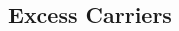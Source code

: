 \documentclass[a4paper, fontsize=8pt, landscape, DIV=1]{scrartcl}
\begin{document}
\begin{multicols*}{4}
%
%
%
%
% 

  \section{Excess Carriers}


\end{multicols*}
\end{document}
